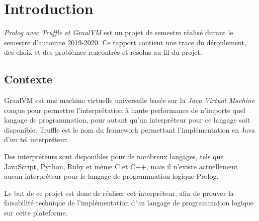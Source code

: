 \documentclass[../report.tex]{subfiles}
\begin{document}
\section{Introduction}
\textit{Prolog avec Truffle et GraalVM} est un projet de semestre réalisé durant le semestre d'automne 2019-2020. Ce rapport contient une trace du déroulement, des choix et des problèmes rencontrés et résolus au fil du projet.
\subsection{Contexte}
GraalVM est une machine virtuelle universelle basée sur la \textit{Java Virtual Machine} conçue pour permettre l'interprétation à haute performance de n'importe quel langage de programmation, pour autant qu'un interpréteur pour ce langage soit disponible.  Truffle est le nom du framework permettant l'implémentation en Java d'un tel interpréteur.

Des interpréteurs sont disponibles pour de nombreux langages, tels que JavaScript, Python, Ruby et même C et C++, mais il n'existe actuellement aucun interpréteur pour le langage de programmation logique Prolog.

Le but de ce projet est donc de réaliser cet interpréteur, afin de prouver la faisabilité technique de l'implémentation d'un langage de programmation logique sur cette plateforme.
\end{document}
